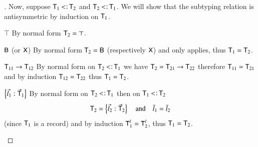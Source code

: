 \documentclass{report}
\begin{document}
\begin{proof}[]
    Now, suppose $\type{T}_1\subtype\type{T}_2$ and $\type{T}_2\subtype\type{T}_1$.
    We will show that the subtyping relation is antisymmetric by induction on $\textsf{T}_1$.
    \begin{indcase}{$\top$}
      By normal form $\textsf{T}_2=\top$.
    \end{indcase}
    \begin{indcase}{$\textsf{B}$ (or $\textsf{X}$)}
      By normal form $\textsf{T}_2=\textsf{B}$ (respectively $\textsf{X}$) and only
      \sref applies, thus $\textsf{T}_1=\textsf{T}_2$.
    \end{indcase}
    \begin{indcase}{$\textsf{T}_{11}\rightarrow\textsf{T}_{12}$}
      By normal form on $\type{T}_2\subtype\type{T}_1$ we have
      $\textsf{T}_2=\textsf{T}_{21}\rightarrow\textsf{T}_{22}$ therefore
      $\textsf{T}_{11}=\textsf{T}_{21}$ and by induction $\textsf{T}_{12}=\textsf{T}_{22}$
      thus $\textsf{T}_1=\textsf{T}_2$.
    \end{indcase}
    \begin{indcase}{$\left\{\vec{l}_1:\vec{\textsf{T}}_1\right\}$}
      By normal form on $\type{T}_2\subtype\type{T}_1$ then on $\type{T}_1\subtype\type{T}_2$
      \begin{displaymath}
        \textsf{T}_2=\left\{\vec{l}_2:\vec{\textsf{T}}_2\right\}\quad\textrm{and}\quad
        \bar{l}_1=\bar{l}_2
      \end{displaymath}
      (since $\textsf{T}_1$ is a record) and by induction $\textsf{T}_1^l=\textsf{T}_2^l$,
      thus $\textsf{T}_1=\textsf{T}_2$.
    \end{indcase}
  \end{proof}
  
\end{document}
